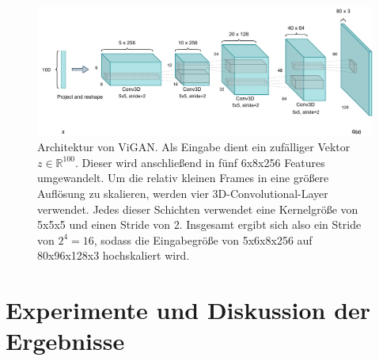 \begin{figure}
    \centering
    \includegraphics[width=\textwidth]{images/ViGAN.pdf}
    \caption{Architektur von ViGAN. Als Eingabe dient ein zufälliger Vektor $z
    \in \mathbb{R}^{100}$. Dieser wird anschließend in fünf 6x8x256 Features
    umgewandelt. Um die relativ kleinen Frames in eine größere Auflösung zu
    skalieren, werden vier 3D-Convolutional-Layer verwendet. Jedes dieser
    Schichten verwendet eine Kernelgröße von 5x5x5 und einen Stride von 2.
    Insgesamt ergibt sich also ein Stride von $2^4 = 16$, sodass die
    Eingabegröße von 5x6x8x256 auf 80x96x128x3 hochskaliert wird.}
    \label{fig:vigan}
\end{figure}

\section{Experimente und Diskussion der Ergebnisse}